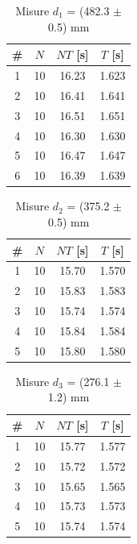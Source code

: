 
\begin{table}[H]
    \centering
    \begin{tabular}{c|c|c|c}
      \# & $N$ & $NT$ [s] & $T$ [s] \\
      \hline
      1 & 10 & 16.23 & 1.623 \\
      2 & 10 & 16.41 & 1.641 \\
      3 & 10 & 16.51 & 1.651 \\
      4 & 10 & 16.30 & 1.630 \\
      5 & 10 & 16.47 & 1.647 \\
      6 & 10 & 16.39 & 1.639 \\
    \end{tabular}
    \caption{Misure $d_1$ = (482.3 $\pm$ 0.5) mm}
    \label{tab:misure_d1}
\end{table}

\begin{table}[H]
    \centering
    \begin{tabular}{c|c|c|c}
      \# & $N$ & $NT$ [s] & $T$ [s] \\
      \hline
      1 & 10 & 15.70 & 1.570 \\
      2 & 10 & 15.83 & 1.583 \\
      3 & 10 & 15.74 & 1.574 \\
      4 & 10 & 15.84 & 1.584 \\
      5 & 10 & 15.80 & 1.580 \\
    \end{tabular}
    \caption{Misure $d_2$ = (375.2 $\pm$ 0.5) mm}
    \label{tab:misure_d2}
\end{table}

\begin{table}[H]
    \centering
    \begin{tabular}{c|c|c|c}
      \# & $N$ & $NT$ [s] & $T$ [s] \\
      \hline
      1 & 10 & 15.77 & 1.577 \\
      2 & 10 & 15.72 & 1.572 \\
      3 & 10 & 15.65 & 1.565 \\
      4 & 10 & 15.73 & 1.573 \\
      5 & 10 & 15.74 & 1.574 \\
    \end{tabular}
    \caption{Misure $d_3$ = (276.1 $\pm$ 1.2) mm}
    \label{tab:misure_d3}
\end{table}

